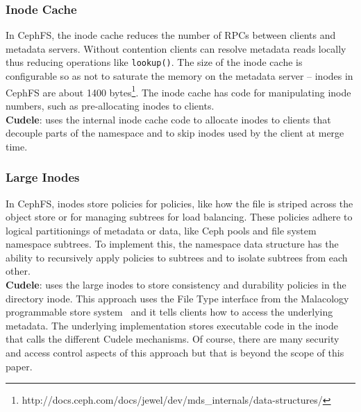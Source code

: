 \subsubsection{Inode Cache}
\label{sec:inode-cache}

In CephFS, the inode cache reduces the number of RPCs between clients and
metadata servers. Without contention clients can resolve metadata reads locally
thus reducing operations like \texttt{lookup()}. The size of the inode cache is
configurable so as not to saturate the memory on the metadata server -- inodes
in CephFS are about 1400
bytes\footnote{http://docs.ceph.com/docs/jewel/dev/mds\_internals/data-structures/}.
The inode cache has code for manipulating inode numbers, such as pre-allocating
inodes to clients.\\

\noindent\textbf{Cudele}: uses the internal inode cache code to allocate inodes
to clients that decouple parts of the namespace and to skip inodes used by the
client at merge time.

\subsubsection{Large Inodes}
\label{sec:large-inodes}

In CephFS, inodes store policies for policies, like how the file is striped
across the object store or for managing subtrees for load balancing. These
policies adhere to logical partitionings of metadata or data, like Ceph pools and file
system namespace subtrees. To implement this, the namespace data structure has
the ability to recursively apply policies to subtrees and to isolate subtrees
from each other.  \\

\noindent\textbf{Cudele}: uses the large inodes to store consistency and
durability policies in the directory inode. This approach uses the File Type
interface from the Malacology programmable store
system~\cite{sevilla:eurosys17} and it tells clients how to access the
underlying metadata. The underlying implementation stores executable code in
the inode that calls the different Cudele mechanisms. Of course, there are many
security and access control aspects of this approach but that is beyond the
scope of this paper.



%



